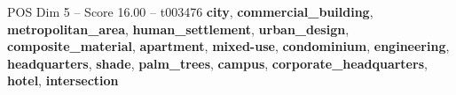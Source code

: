 \begin{textsample}{POS Dim 5 – Score 16.00 – t003476}  \label{ex:f5_pos_027}
\textbf{city}, \textbf{commercial\_building}, \textbf{metropolitan\_area}, \textbf{human\_settlement}, \textbf{urban\_design}, \textbf{composite\_material}, \textbf{apartment}, \textbf{mixed-use}, \textbf{condominium}, \textbf{engineering}, \textbf{headquarters}, \textbf{shade}, \textbf{palm\_trees}, \textbf{campus}, \textbf{corporate\_headquarters}, \textbf{hotel}, \textbf{intersection}

\end{textsample}
